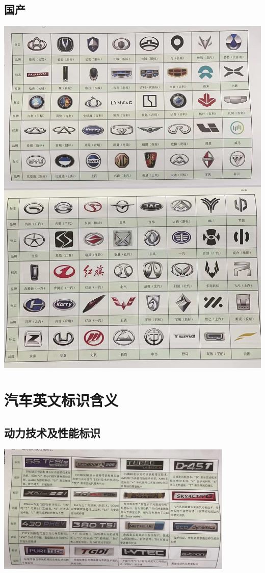 \subsection{国产}
	\begin{center}
		\includegraphics[width=1\textwidth]{6-3}
	\end{center}

\section{汽车英文标识含义}
\subsection{动力技术及性能标识}
	\begin{center}
		\includegraphics[width=0.85\textwidth]{6-4}
	\end{center}
